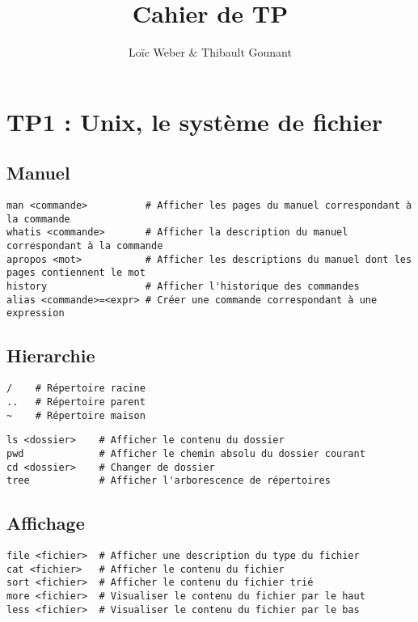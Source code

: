 \documentclass{article}
\author{Loïc Weber \& Thibault Gounant}
\title{Cahier de TP}
\begin{document}
\setlength\parindent{0pt}

\maketitle

\renewcommand*\contentsname{Table des matières}
\tableofcontents

\section{TP1 : Unix, le système de fichier}

\subsection{Manuel}
\begin{verbatim}
man <commande>          # Afficher les pages du manuel correspondant à la commande
whatis <commande>       # Afficher la description du manuel correspondant à la commande
apropos <mot>           # Afficher les descriptions du manuel dont les pages contiennent le mot 
history                 # Afficher l'historique des commandes
alias <commande>=<expr> # Créer une commande correspondant à une expression
\end{verbatim}

\subsection{Hierarchie}
\begin{verbatim}
/    # Répertoire racine
..   # Répertoire parent
~    # Répertoire maison
\end{verbatim}

\begin{verbatim}
ls <dossier>    # Afficher le contenu du dossier
pwd             # Afficher le chemin absolu du dossier courant
cd <dossier>    # Changer de dossier
tree            # Afficher l'arborescence de répertoires
\end{verbatim}

\subsection{Affichage}
\begin{verbatim}
file <fichier>  # Afficher une description du type du fichier
cat <fichier>   # Afficher le contenu du fichier
sort <fichier>  # Afficher le contenu du fichier trié
more <fichier>  # Visualiser le contenu du fichier par le haut
less <fichier>  # Visualiser le contenu du fichier par le bas
\end{verbatim}
\end{document}
